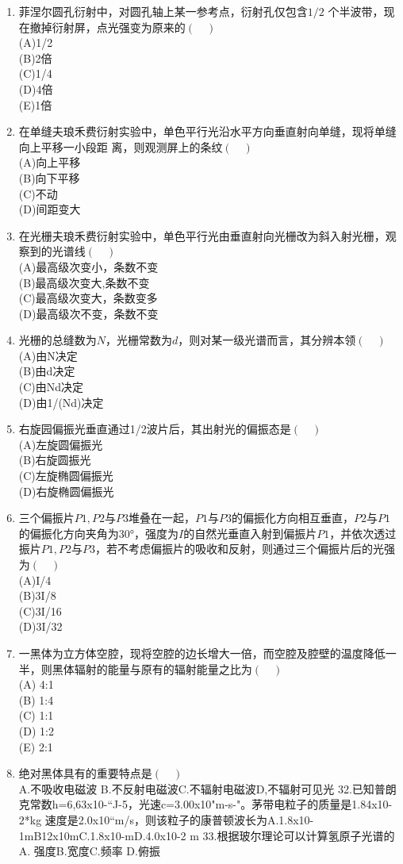 \begin{enumerate}
\item 菲涅尔圆孔衍射中，对圆孔轴上某一参考点，衍射孔仅包含$ 1/2$ 个半波带，现在撤掉衍射屏，点光强变为原来的$(\quad)$\\
(A)1/2\\
(B)2倍\\
(C)1/4\\
(D)4倍\\
(E)1倍
\item 在单缝夫琅禾费衍射实验中，单色平行光沿水平方向垂直射向单缝，现将单缝向上平移一小段距
离，则观测屏上的条纹$(\quad)$\\
(A)向上平移\\
(B)向下平移\\
(C)不动\\
(D)间距变大
\item 在光栅夫琅禾费衍射实验中，单色平行光由垂直射向光栅改为斜入射光栅，观察到的光谱线$(\quad)$\\
(A)最高级次变小，条数不变\\
(B)最高级次变大,条数不变\\
(C)最高级次变大，条数变多\\
(D)最高级次不变，条数不变
\item 光栅的总缝数为$N$，光栅常数为$d$，则对某一级光谱而言，其分辨本领$(\quad)$\\
(A)由N决定\\
(B)由d决定\\
(C)由Nd决定\\
(D)由1/(Nd)决定
\item 右旋园偏振光垂直通过1/2波片后，其出射光的偏振态是$(\quad)$\\
(A)左旋圆偏振光\\
(B)右旋圆振光\\
(C)左旋椭圆偏振光\\
(D)右旋椭圆偏振光
\item 三个偏振片$P1,P2$与$P3$堆叠在一起，$P1$与$P3$的偏振化方向相互垂直，$P2$与$P1$的偏振化方向夹角为30°，强度为$I$的自然光垂直入射到偏振片$P1$，并依次透过振片$P1,P2$与$P3$，若不考虑偏振片的吸收和反射，则通过三个偏振片后的光强为$(\quad)$\\
(A)I/4\\
(B)3I/8\\
(C)3I/16\\
(D)3I/32
\item 一黑体为立方体空腔，现将空腔的边长增大一倍，而空腔及腔壁的温度降低一半，则黑体辐射的能量与原有的辐射能量之比为$(\quad)$\\
(A) 4:1\\
(B) 1:4\\
(C) 1:1\\
(D) 1:2\\
(E) 2:1
\item 绝对黑体具有的重要特点是$(\quad)$\\
A.不吸收电磁波 B.不反射电磁波C.不辐射电磁波D,不辐射可见光
32.已知普朗克常数h=6,63x10-“J-5，光速c=3.00x10"m-s-"。茅带电粒子的质量是1.84x10-2*kg
速度是2.0x10“m/s，则该粒子的康普顿波长为A.1.8x10-1mB12x10mC.1.8x10-mD.4.0x10-2 m
33.根据玻尔理论可以计算氢原子光谱的
A. 强度B.宽度C.频率
D.俯振
\end{enumerate}